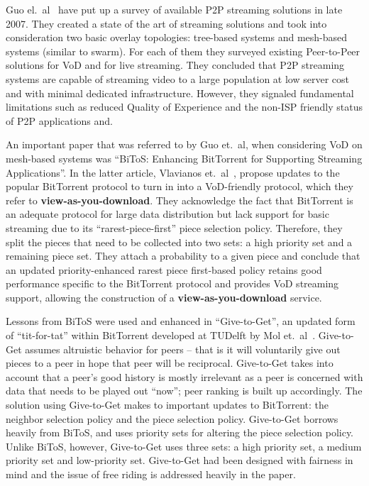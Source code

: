 Guo el.~al~\cite{p2p-streaming-survey} have put up a survey of available P2P streaming
solutions in late 2007. They created a state of the art of streaming solutions
and took into consideration two basic overlay topologies: tree-based systems
and mesh-based systems (similar to swarm). For each of them they surveyed
existing Peer-to-Peer solutions for VoD and for live streaming. They concluded
that P2P streaming systems are capable of streaming video to a large
population at low server cost and with minimal dedicated infrastructure.
However, they signaled fundamental limitations such as reduced Quality of
Experience and the non-ISP friendly status of P2P applications and.

An important paper that was referred to by Guo et.~al, when considering VoD on
mesh-based systems was ``BiToS: Enhancing BitTorrent for Supporting Streaming
Applications''. In the latter article, Vlavianos et.~al~\cite{bitos}, propose
updates to the popular BitTorrent protocol to turn in into a VoD-friendly
protocol, which they refer to \textbf{view-as-you-download}. They acknowledge
the fact that BitTorrent is an adequate protocol for large data distribution
but lack support for basic streaming due to its ``rarest-piece-first'' piece
selection policy. Therefore, they split the pieces that need to be collected
into two sets: a high priority set and a remaining piece set. They attach a
probability to a given piece and conclude that an updated priority-enhanced
rarest piece first-based policy retains good performance specific to the
BitTorrent protocol and provides VoD streaming support, allowing the
construction of a \textbf{view-as-you-download} service.

Lessons from BiToS were used and enhanced in ``Give-to-Get'', an updated form
of ``tit-for-tat'' within BitTorrent developed at TUDelft by Mol
et.~al~\cite{give-to-get}. Give-to-Get assumes altruistic behavior for peers -- that
is it will voluntarily give out pieces to a peer in hope that peer will be
reciprocal. Give-to-Get takes into account that a peer's good history is
mostly irrelevant as a peer is concerned with data that needs to be played out
``now''; peer ranking is built up accordingly. The solution using Give-to-Get
makes to important updates to BitTorrent: the neighbor selection policy and
the piece selection policy. Give-to-Get borrows heavily from BiToS, and uses
priority sets for altering the piece selection policy. Unlike BiToS, however,
Give-to-Get uses three sets: a high priority set, a medium priority set and
low-priority set. Give-to-Get had been designed with fairness in mind and the
issue of free riding is addressed heavily in the paper.

